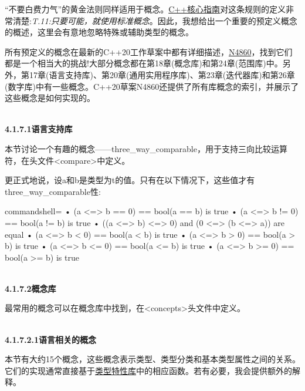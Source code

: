 “不要白费力气”的黄金法则同样适用于概念。\href{https://isocpp.github. io/CppCoreGuidelines/CppCoreGuidelines}{C++核心指南}对这条规则的定义非常清楚:\textit{T.11:只要可能，就使用标准概念}。因此，我想给出一个重要的预定义概念的概述，这里会有意地忽略特殊或辅助类型的概念。

所有预定义的概念在最新的C++20工作草案中都有详细描述，\href{https://isocpp.org/files/papers/N4860.pdf}{N4860}，找到它们都是一个相当大的挑战!大部分概念都在第18章(概念库)和第24章(范围库)中。另外，第17章(语言支持库)、第20章(通用实用程序库)、第23章(迭代器库)和第26章(数字库)中有一些概念。C++20草案N4860还提供了所有库概念的索引，并展示了这些概念是如何实现的。

\hspace*{\fill} \\ %
\noindent
\textbf{4.1.7.1\hspace{0.2cm}语言支持库}

本节讨论一个有趣的概念——three\_way\_comparable，用于支持三向比较运算符，在头文件<compare>中定义。

更正式地说，设a和b是类型为t的值。只有在以下情况下，这些值才有three\_way\_comparable性:

\begin{tcblisting}{commandshell={}}
• (a <=> b == 0) == bool(a == b) is true
• (a <=> b != 0) == bool(a != b) is true
• ((a <=> b) <=> 0) and (0 <=> (b <=> a)) are equal
• (a <=> b < 0) == bool(a < b) is true
• (a <=> b > 0) == bool(a > b) is true
• (a <=> b <= 0) == bool(a <= b) is true
• (a <=> b >= 0) == bool(a >= b) is true
\end{tcblisting}

\hspace*{\fill} \\ %
\noindent
\textbf{4.1.7.2\hspace{0.2cm}概念库}

最常用的概念可以在概念库中找到，在<concepts>头文件中定义。

\hspace*{\fill} \\ %
\noindent
\textbf{4.1.7.2.1\hspace{0.2cm}语言相关的概念}

本节有大约15个概念，这些概念表示类型、类型分类和基本类型属性之间的关系。它们的实现通常直接基于\href{https://en.cppreference.com/w/cpp/header/type_traits}{类型特性库}中的相应函数。若有必要，我会提供额外的解释。

